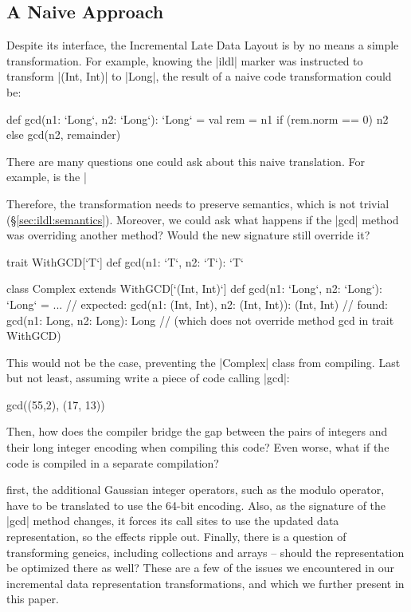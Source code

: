 \subsection{A Naive Approach}

Despite its interface, the Incremental Late Data Layout is by no means a simple transformation. For example, knowing the |ildl| marker was instructed to transform |(Int, Int)| to |Long|, the result of a naive code transformation could be:

\begin{lstlisting-nobreak}
def gcd(n1: `Long`, n2: `Long`): `Long` = {
  val rem = n1 %
  if (rem.norm == 0) n2 else gcd(n2, remainder)
}
\end{lstlisting-nobreak}

There are many questions one could ask about this naive translation. For example, is the |%

Therefore, the transformation needs to preserve semantics, which is not trivial (\S\ref{sec:ildl:semantics}). Moreover, we could ask what happens if the |gcd| method was overriding another method? Would the new signature still override it?


\begin{lstlisting-nobreak}
trait WithGCD[`T`] {
  def gcd(n1: `T`, n2: `T`): `T`
}

class Complex extends WithGCD[`(Int, Int)`] {
  def gcd(n1: `Long`, n2: `Long`): `Long` = ...
  // expected: gcd(n1: (Int, Int), n2: (Int, Int)): (Int, Int)
  // found:    gcd(n1: Long, n2: Long): Long
  // (which does not override method gcd in trait WithGCD)
}
\end{lstlisting-nobreak}
%

This would not be the case, preventing the |Complex| class from compiling. Last but not least, assuming write a piece of code calling |gcd|:

\begin{lstlisting-nobreak}
gcd((55,2), (17, 13))
\end{lstlisting-nobreak}

Then, how does the compiler bridge the gap between the pairs of integers and their long integer encoding when compiling this code? Even worse, what if the code is compiled in a separate compilation?


first, the additional Gaussian integer operators, such as the modulo operator, have to be translated to use the 64-bit encoding. Also, as the signature of the |gcd| method changes, it forces its call sites to use the updated data representation, so the effects ripple out. Finally, there is a question of transforming geneics, including collections and arrays -- should the representation be optimized there as well? These are a few of the issues we encountered in our incremental data representation transformations, and which we further present in this paper.
